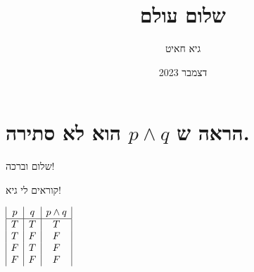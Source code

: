 \documentclass{article}
\begin{document}
\title{שלום עולם}
\author{גיא חאיט}
\date{דצמבר 2023}
\maketitle

\section{הראה ש $p \wedge q$ הוא לא סתירה.}

שלום וברכה!

קוראים לי גיא!

$
\begin{array}{|c | c | c|}
     p & q & p \wedge q \\
     \hline
     T & T & T \\
     T & F & F \\
     F & T & F \\
     F & F & F \\
\end{array}
$
\end{document}
